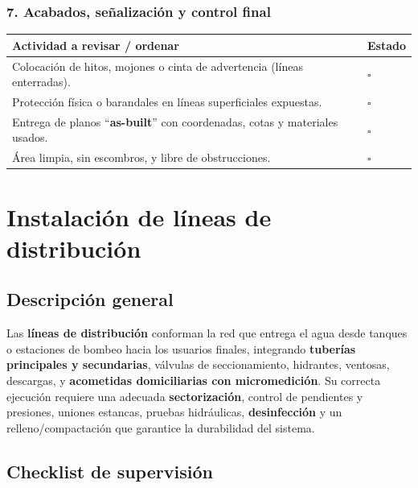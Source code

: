 \documentclass[12pt]{article}
\newcommand{\cbox}{\(\square\)} %
\begin{document}
	\subsubsection*{7. Acabados, señalización y control final}
	\begin{tabularx}{\linewidth}{>{\raggedright\arraybackslash}p{0.93\linewidth} >{\centering\arraybackslash}m{0.07\linewidth}}
		\toprule
		\textbf{Actividad a revisar / ordenar} & \textbf{Estado}\\
		\midrule
		Colocación de hitos, mojones o cinta de advertencia (líneas enterradas). & \cbox \\
		Protección física o barandales en líneas superficiales expuestas. & \cbox \\
		Entrega de planos “\textbf{as-built}” con coordenadas, cotas y materiales usados. & \cbox \\
		Área limpia, sin escombros, y libre de obstrucciones. & \cbox \\
		\bottomrule
	\end{tabularx}
	
	
	
	

	
	
	
	\section{Instalación de líneas de distribución}
	
	\subsection*{Descripción general}
	Las \textbf{líneas de distribución} conforman la red que entrega el agua desde tanques o estaciones de bombeo hacia los usuarios finales, integrando \textbf{tuberías principales y secundarias}, válvulas de seccionamiento, hidrantes, ventosas, descargas, y \textbf{acometidas domiciliarias con micromedición}.  
	Su correcta ejecución requiere una adecuada \textbf{sectorización}, control de pendientes y presiones, uniones estancas, pruebas hidráulicas, \textbf{desinfección} y un relleno/compactación que garantice la durabilidad del sistema.
	

	\subsection{Checklist de supervisión}
	
\end{document}
